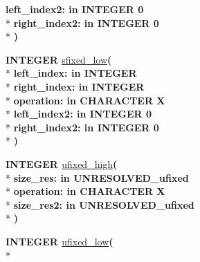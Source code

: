\begin{DoxyCompactItemize}
{\bfseries \textcolor{vhdlchar}{left\+\_\+index2\+: }\textcolor{stringliteral}{in }\textcolor{vhdlchar}{I\+N\+T\+E\+G\+E\+R   0}}\\*
{\bfseries \textcolor{vhdlchar}{right\+\_\+index2\+: }\textcolor{stringliteral}{in }\textcolor{vhdlchar}{I\+N\+T\+E\+G\+E\+R   0}}\\*
{\bfseries  )} 
\item 
{\bfseries {\bfseries \textcolor{comment}{I\+N\+T\+E\+G\+E\+R}\textcolor{vhdlchar}{ }}} \hyperlink{class__fixed__pkg_acf965cb1a906fb0fdc4b9bbbfdedcc82}{sfixed\+\_\+low}{\bfseries  ( }\\*
{\bfseries \textcolor{vhdlchar}{left\+\_\+index\+: }\textcolor{stringliteral}{in }{\bfseries \textcolor{comment}{I\+N\+T\+E\+G\+E\+R}\textcolor{vhdlchar}{ }}}\\*
{\bfseries \textcolor{vhdlchar}{right\+\_\+index\+: }\textcolor{stringliteral}{in }{\bfseries \textcolor{comment}{I\+N\+T\+E\+G\+E\+R}\textcolor{vhdlchar}{ }}}\\*
{\bfseries \textcolor{vhdlchar}{operation\+: }\textcolor{stringliteral}{in }\textcolor{vhdlchar}{C\+H\+A\+R\+A\+C\+T\+E\+R   \textquotesingle{}\+X\textquotesingle{}}}\\*
{\bfseries \textcolor{vhdlchar}{left\+\_\+index2\+: }\textcolor{stringliteral}{in }\textcolor{vhdlchar}{I\+N\+T\+E\+G\+E\+R   0}}\\*
{\bfseries \textcolor{vhdlchar}{right\+\_\+index2\+: }\textcolor{stringliteral}{in }\textcolor{vhdlchar}{I\+N\+T\+E\+G\+E\+R   0}}\\*
{\bfseries  )} 
\item 
{\bfseries {\bfseries \textcolor{comment}{I\+N\+T\+E\+G\+E\+R}\textcolor{vhdlchar}{ }}} \hyperlink{class__fixed__pkg_a62041ee415c981b256e2b111fa8e2576}{ufixed\+\_\+high}{\bfseries  ( }\\*
{\bfseries \textcolor{vhdlchar}{size\+\_\+res\+: }\textcolor{stringliteral}{in }\textcolor{vhdlchar}{U\+N\+R\+E\+S\+O\+L\+V\+E\+D\+\_\+ufixed}}\\*
{\bfseries \textcolor{vhdlchar}{operation\+: }\textcolor{stringliteral}{in }\textcolor{vhdlchar}{C\+H\+A\+R\+A\+C\+T\+E\+R   \textquotesingle{}\+X\textquotesingle{}}}\\*
{\bfseries \textcolor{vhdlchar}{size\+\_\+res2\+: }\textcolor{stringliteral}{in }\textcolor{vhdlchar}{U\+N\+R\+E\+S\+O\+L\+V\+E\+D\+\_\+ufixed}}\\*
{\bfseries  )} 
\item 
{\bfseries {\bfseries \textcolor{comment}{I\+N\+T\+E\+G\+E\+R}\textcolor{vhdlchar}{ }}} \hyperlink{class__fixed__pkg_a61464bf9312d1c70133d4f048e446dd7}{ufixed\+\_\+low}{\bfseries  ( }\\*

\end{DoxyCompactItemize}
